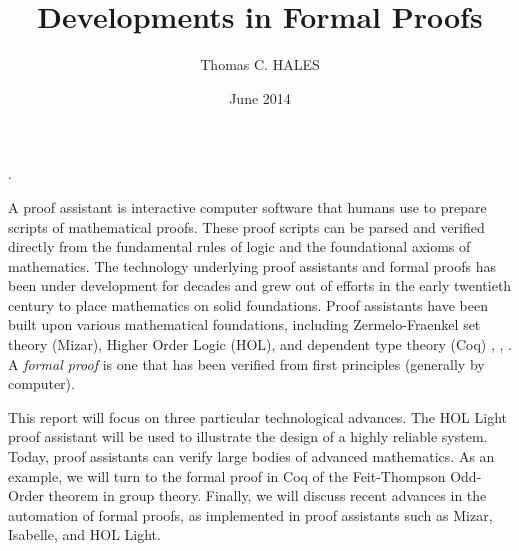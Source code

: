 \documentclass[brochure,english,12pt]{bourbaki}
\date{June 2014}
\title{Developments in Formal Proofs}
\author{Thomas C. HALES}
\theoremstyle{plain}
\begin{document}
\maketitle



{

. %




}

\bigskip



A proof assistant is interactive computer software that humans use to prepare scripts of mathematical proofs.
These proof scripts can be parsed and verified directly from
the fundamental rules of logic and the foundational axioms of mathematics.  
The
technology underlying proof assistants and formal proofs has been under development for decades and grew out
of efforts in the early twentieth century to place mathematics on solid foundations.
 Proof assistants have been built upon various mathematical foundations, including
Zermelo-Fraenkel set theory (Mizar), Higher Order Logic (HOL), and dependent type theory (Coq)
\cite{Mizar}, \cite{HOLL}, \cite{Coq}.
A {\it formal proof} is one that has been verified from first principles (generally by computer).  


This report
will focus on three  particular technological advances.
The HOL Light proof assistant will be used to illustrate the design of a highly reliable system.
Today, proof assistants can verify large bodies of advanced 
mathematics.    As an example, we will
turn to the formal proof in Coq of the Feit-Thompson Odd-Order theorem in group theory.
Finally, we will discuss recent advances in the automation of formal proofs, as implemented in proof assistants
such as Mizar, Isabelle, and HOL Light.

\end{document}

